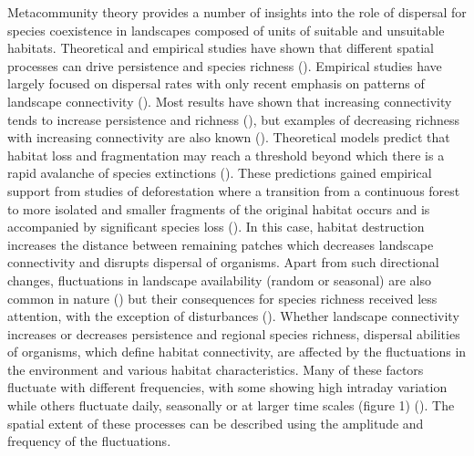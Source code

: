 \documentclass[12pt]{article}
\begin{document}
Metacommunity theory provides a number of insights into the role of dispersal for species coexistence in landscapes composed of units of suitable and unsuitable habitats. Theoretical and empirical studies have shown that different spatial processes can drive persistence and species richness (\cite{Holyoaketal2005}). Empirical studies have largely focused on dispersal rates with only recent emphasis on patterns of landscape connectivity (\cite{kneitel2004, cadotte2006}). Most results have shown that increasing connectivity tends to increase persistence and richness (\cite{ellneretal2001, foxetal2011}), but examples of decreasing richness with increasing connectivity are also known (\cite{daviesetal2009, altermattetal2011}). Theoretical models predict that habitat loss and fragmentation may reach a threshold beyond which there is a rapid avalanche of species extinctions (\cite{fahrig2002,ovaskainenhanski2003,rybickihanski2013}). These predictions gained empirical support from studies of deforestation where a transition from a continuous forest to more isolated and smaller fragments of the original habitat occurs and is accompanied by significant species loss (\cite{LauranceEtAl1997, MetzgerEtAl2009}). In this case, habitat destruction increases the distance between remaining patches which decreases landscape connectivity and disrupts dispersal of organisms. Apart from such directional changes, fluctuations in landscape availability (random or seasonal) are also common in nature (\cite{Sprugel1991, RuizEtAl2014}) but their consequences for species richness received less attention, with the exception of disturbances (\cite{Sousa1984, SuppErnest2014}). Whether landscape connectivity increases or decreases persistence and regional species richness, dispersal abilities of organisms, which define habitat connectivity, are affected by the fluctuations in the environment and various habitat characteristics. Many of these factors fluctuate with different frequencies, with some showing high intraday variation while others fluctuate daily, seasonally or at larger time scales (figure 1) (\cite{StensethEtAl2002}). The spatial extent of these processes can be described using the amplitude and frequency of the fluctuations.
\end{document}
